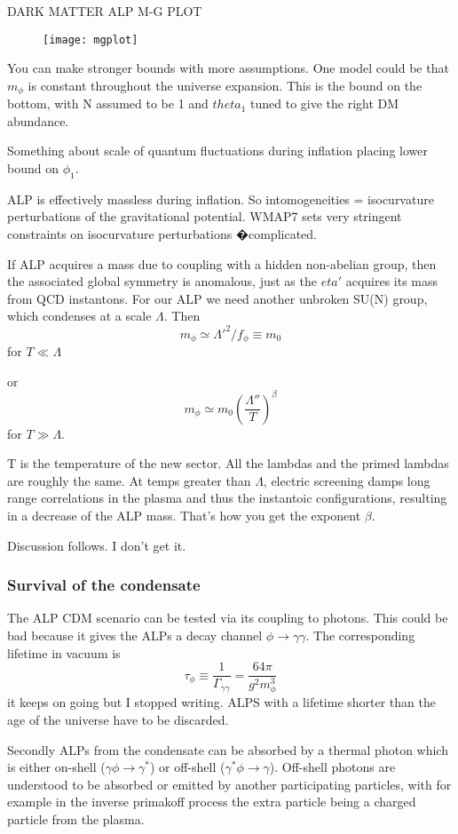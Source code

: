 \documentclass[12pt, twoside]{book}
\begin{document}
DARK MATTER ALP M-G PLOT
\begin{figure}
\texttt{[image: mgplot]}
\end{figure}

You can make stronger bounds with more assumptions. One model could be that $m_\phi$ is constant throughout the universe expansion. This is the bound on the bottom, with N assumed to be 1 and $theta_1$ tuned to give the right DM abundance.

Something about scale of quantum fluctuations during inflation placing lower bound on $\phi_1$.

ALP is effectively massless during inflation. So intomogeneities = isocurvature perturbations of the gravitational potential. WMAP7 sets very stringent constraints on isocurvature perturbations
�complicated.


If ALP acquires a mass due to coupling with a hidden non-abelian group, then the associated global symmetry is anomalous, just as the $eta'$ acquires its mass from QCD instantons. For our ALP we need another unbroken SU(N) group, which condenses at a scale $\Lambda$. Then
\[
m_\phi \simeq \Lambda'^2/f_\phi \equiv m_0
\]
for $T \ll \Lambda$

or 
\[ m_\phi \simeq m_0 (\frac{\Lambda''}{T})^{\beta} 
\]
for $T \gg \Lambda$.

T is the temperature of the new sector. All the lambdas and the primed lambdas are roughly the same. At temps greater than $\Lambda$, electric screening damps long range correlations in the plasma and thus the instantoic configurations, resulting in a decrease of the ALP mass. That's how you get the exponent $\beta$.

Discussion follows. I don't get it.

\subsubsection{Survival of the condensate}

The ALP CDM scenario can be tested via its coupling to photons. This could be bad because it gives the ALPs a decay channel $\phi \rightarrow \gamma\gamma$. The corresponding lifetime in vacuum is
\[
\tau_\phi \equiv \frac{1}{\Gamma_{\gamma\gamma}} = \frac{64 \pi}{g^2 m_\phi^3}
\]
it keeps on going but I stopped writing. ALPS with a lifetime shorter than the age of the universe have to be discarded.

Secondly ALPs from the condensate can be absorbed by a thermal photon which is either on-shell ($\gamma \phi \rightarrow \gamma^*$) or off-shell ($\gamma^*\phi \rightarrow \gamma$). Off-shell photons are understood to be absorbed or emitted by another participating particles, with for example in the inverse primakoff process the extra particle being a charged particle from the plasma.
\end{document}

